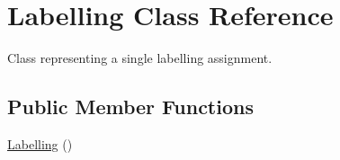 \hypertarget{classLabelling}{\section{Labelling Class Reference}
\label{classLabelling}
}


Class representing a single labelling assignment.  


\subsection*{Public Member Functions}
\begin{DoxyCompactItemize}
\item 
\hypertarget{classLabelling_a1b39efa4639854ab11d540037e24c425}{\hyperlink{classLabelling_a1b39efa4639854ab11d540037e24c425}{Labelling} ()}\label{classLabelling_a1b39efa4639854ab11d540037e24c425}


\end{DoxyCompactItemize}
